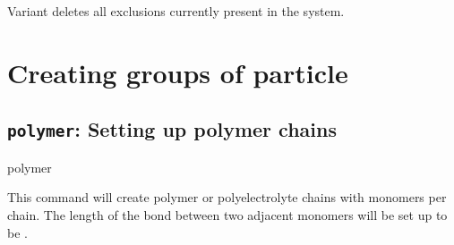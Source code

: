 Variant  deletes all exclusions currently present in the
system.

\section{Creating groups of particle}

\subsection{\texttt{polymer}: Setting up polymer chains}

\begin{essyntax}
  polymer 
   
  \\
\end{essyntax}

This command will create  polymer or
polyelectrolyte chains with  monomers per
chain. The length of the bond between two adjacent monomers will be
set up to be .

